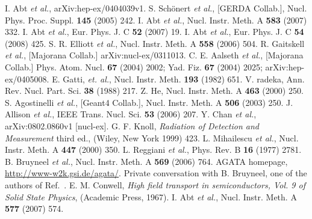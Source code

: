 \documentclass[epj,referee]{svjour}
\begin{document}
\begin{thebibliography}{}
I. Abt \textit{et al.}, arXiv:hep-ex/0404039v1.
S. Sch\"onert \textit{et al.}, [GERDA Collab.],
Nucl. Phys. Proc. Suppl. \textbf{145} (2005) 242.
I. Abt \textit{et al.}, Nucl. Instr. Meth. A
\textbf{583} (2007) 332.
I. Abt \textit{et al.}, Eur. Phys. J. C \textbf{52}
(2007) 19.
I. Abt \textit{et al.}, Eur. Phys. J. C \textbf{54}
(2008) 425.
S. R. Elliott \textit{et al.}, Nucl. Instr. Meth. A
\textbf{558} (2006) 504.
R. Gaitskell \textit{et al.}, [Majorana Collab.]
arXiv:nucl-ex/0311013.
C. E. Aalseth \textit{et al.}, [Majorana Collab.]
Phys. Atom. Nucl. \textbf{67} (2004) 2002; Yad. Fiz. \textbf{67}
(2004) 2025; arXiv:hep-ex/0405008.
E. Gatti, \textit{et. al.},
Nucl. Instr. Meth. \textbf{193} (1982) 651.
V. radeka, Ann. Rev. Nucl. Part. Sci. \textbf{38}
(1988) 217.
Z. He, Nucl. Instr. Meth. A \textbf{463} (2000) 250.
S. Agostinelli \textit{et al.}, [Geant4 Collab.],
Nucl. Instr. Meth. A \textbf{506} (2003) 250.
J. Allison \textit{et al.}, IEEE
Trans. Nucl. Sci. \textbf{53} (2006) 207.
Y. Chan \textit{et al.}, arXiv:0802.0860v1 [nucl-ex].
G. F. Knoll, \textit{Radiation of Detection and
Measurement} third ed., (Wiley, New York 1999) 423.
L. Mihailescu \textit{et al.}, Nucl. Instr. Meth. A
\textbf{447} (2000) 350.
L. Reggiani \textit{et al.}, Phys. Rev. B \textbf{16}
(1977) 2781.
B. Bruyneel \textit{et al.}, Nucl. Instr. Meth. A
\textbf{569} (2006) 764.
AGATA homepage, \url{http://www-w2k.gsi.de/agata/}.
Private conversation with B. Bruyneel, one of the
authors of Ref.~\cite{bart}.
E. M. Conwell, \textit{High field transport in
semiconductors, Vol. 9 of Solid State Physics}, (Academic Press,
1967).
I. Abt \textit{et al.}, Nucl. Instr. Meth. A \textbf{577}
(2007) 574.

\end{thebibliography}
%
\end{document}
